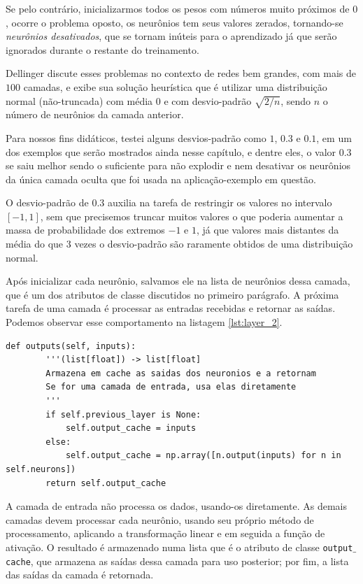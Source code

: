 Se pelo contrário, inicializarmos todos os pesos com números muito próximos de $0$, ocorre o problema oposto, os neurônios tem seus valores zerados, tornando-se \emph{neurônios desativados}, que se tornam inúteis para o aprendizado já que serão ignorados durante o restante do treinamento. 

Dellinger \citep{layers_1} discute esses problemas no contexto de redes bem grandes, com mais de $100$ camadas, e exibe sua solução heurística que é utilizar uma distribuição normal (não-truncada) com média $0$ e com desvio-padrão $\sqrt{2/n}$, sendo $n$ o número de neurônios da camada anterior.

Para nossos fins didáticos, testei alguns desvios-padrão como $1$, $0.3$ e $0.1$, em um dos exemplos que serão mostrados ainda nesse capítulo, e dentre eles, o valor $0.3$ se saiu melhor sendo o suficiente para não explodir e nem desativar os neurônios da única camada oculta que foi usada na aplicação-exemplo em questão.

O desvio-padrão de $0.3$ auxilia na tarefa de restringir os valores no intervalo $[-1, 1]$, sem que precisemos truncar muitos valores o que poderia aumentar a massa de probabilidade dos extremos $-1$ e $1$, já que valores mais distantes da média do que $3$ vezes o desvio-padrão são raramente obtidos de uma distribuição normal. 

Após inicializar cada neurônio, salvamos ele na lista de neurônios dessa camada, que é um dos atributos de classe discutidos no primeiro parágrafo. A próxima tarefa de uma camada é processar as entradas recebidas e retornar as saídas. Podemos observar esse comportamento na listagem \ref{lst:layer_2}.
\newline
\estiloR
\begin{lstlisting}[caption={Trecho da classe \eng{Layer}}, label={lst:layer_2}, escapeinside={\%}]
def outputs(self, inputs):
        '''(list[float]) -> list[float]
        Armazena em cache as saidas dos neuronios e a retornam
        Se for uma camada de entrada, usa elas diretamente
        '''
        if self.previous_layer is None:
            self.output_cache = inputs
        else:
            self.output_cache = np.array([n.output(inputs) for n in self.neurons])
        return self.output_cache
\end{lstlisting}


A camada de entrada não processa os dados, usando-os diretamente. As demais camadas devem processar cada neurônio, usando seu próprio método de processamento, aplicando a transformação linear e em seguida a função de ativação. O resultado é armazenado numa lista  que é o atributo de classe \texttt{output$\_$cache}, que armazena as saídas dessa camada para uso posterior; por fim, a lista das saídas da camada é retornada.

